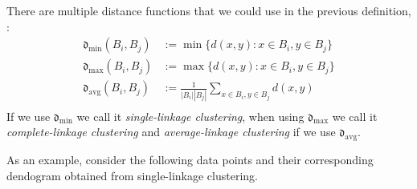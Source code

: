 There are multiple distance functions that we could use in the previous definition, \eg :
\begin{align*}
\mathfrak{d}_\mathrm{min} (B_i, B_j) &:= \min\{d(x,y): x \in B_i, y \in B_j\}\\
\mathfrak{d}_\mathrm{max} (B_i, B_j) &:= \max\{d(x,y): x \in B_i, y \in B_j\}\\
\mathfrak{d}_\mathrm{avg}(B_i,B_j) &:= \frac{1}{|B_i||B_j|} \sum_{x \in B_i, y \in B_j} d(x,y)\\
\end{align*}
If we use $\mathfrak{d}_\mathrm{min}$ we call it \emph{single-linkage clustering}, when using $\mathfrak{d}_\mathrm{max}$ we call it \emph{complete-linkage clustering} and \emph{average-linkage clustering} if we use $\mathfrak{d}_\mathrm{avg}$.

As an example, consider the following data points and their corresponding dendogram obtained from single-linkage clustering.

